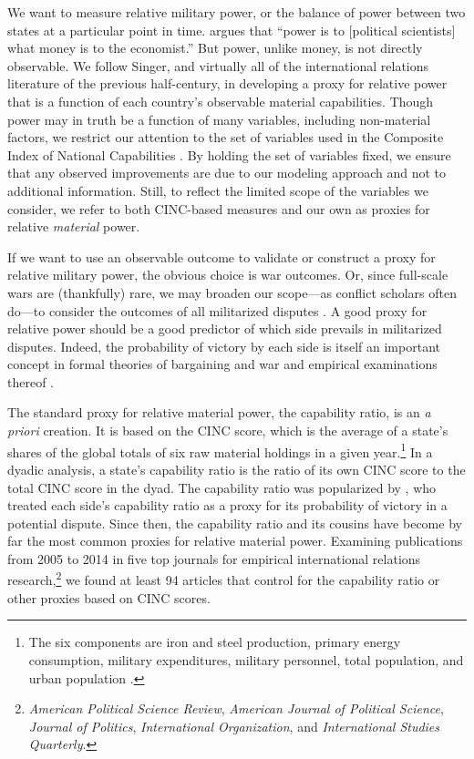 We want to measure relative military power, or the balance of power between two states at a particular point in time.
\citet[420]{singer1963inter} argues that ``power is to [political scientists] what money is to the economist.''
But power, unlike money, is not directly observable.
We follow Singer, and virtually all of the international relations literature of the previous half-century, in developing a proxy for relative power that is a function of each country's observable material capabilities.
Though power may in truth be a function of many variables, including non-material factors, we restrict our attention to the set of variables used in the Composite Index of National Capabilities \citep{singer1972}.
By holding the set of variables fixed, we ensure that any observed improvements are due to our modeling approach and not to additional information.
Still, to reflect the limited scope of the variables we consider, we refer to both CINC-based measures and our own as proxies for relative \emph{material} power.

If we want to use an observable outcome to validate or construct a proxy for relative military power, the obvious choice is war outcomes.
Or, since full-scale wars are (thankfully) rare, we may broaden our scope---as conflict scholars often do---to consider the outcomes of all militarized disputes \citep{Palmer:2015hp}.
A good proxy for relative power should be a good predictor of which side prevails in militarized disputes.
Indeed, the probability of victory by each side is itself an important concept in formal theories of bargaining and war \citep{fearon1995,powell1996stability} and empirical examinations thereof \cite[e.g.][]{reed2008war}.

The standard proxy for relative material power, the capability ratio, is an \emph{a priori} creation.
It is based on the CINC score, which is the average of a state's shares of the global totals of six raw material holdings in a given year.\footnote{%
  The six components are iron and steel production, primary energy consumption, military expenditures, military personnel, total population, and urban population \citep{singer1972}.
}
In a dyadic analysis, a state's capability ratio is the ratio of its own CINC score to the total CINC score in the dyad.
The capability ratio was popularized by \citet[108]{wartrap}, who treated each side's capability ratio as a proxy for its probability of victory in a potential dispute.
Since then, the capability ratio and its cousins have become by far the most common proxies for relative material power.
Examining publications from 2005 to 2014 in five top journals for empirical international relations research,\footnote{%
\label{fn:journals}
  \emph{American Political Science Review}, \emph{American Journal of Political Science}, \emph{Journal of Politics}, \emph{International Organization}, and \emph{International Studies Quarterly}.
}
we found at least 94 articles that control for the capability ratio or other proxies based on CINC scores.

